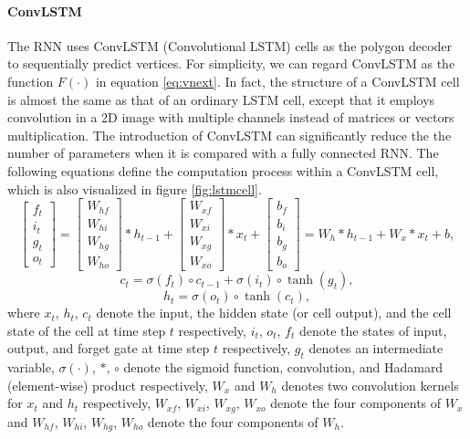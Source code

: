 \paragraph{ConvLSTM} The RNN uses ConvLSTM (Convolutional LSTM) cells as the polygon decoder to sequentially predict vertices. For simplicity, we can regard ConvLSTM as the function $F(\cdot)$ in equation \ref{eq:vnext}. In fact, the structure of a ConvLSTM cell is almost the same as that of an ordinary LSTM cell, except that it employs convolution in a 2D image with multiple channels instead of matrices or vectors multiplication. The introduction of ConvLSTM can significantly reduce the the number of parameters when it is compared with a fully connected RNN. The following equations define the computation process within a ConvLSTM cell, which is also visualized in figure \ref{fig:lstmcell}.
\begin{equation}
	\left[\begin{array}{c}
		f_t\\i_t\\g_t\\o_t
	\end{array}\right] = \left[\begin{array}{c}
		W_{hf}\\W_{hi}\\W_{hg}\\W_{ho}
	\end{array}\right] * h_{t-1} + \left[\begin{array}{c}
		W_{xf}\\W_{xi}\\W_{xg}\\W_{xo}
	\end{array}\right] * x_{t} + \left[\begin{array}{c}
		b_f\\b_i\\b_g\\b_o
	\end{array}\right] = W_h * h_{t-1} + W_x * x_t + b,
\end{equation}
\begin{equation}
	c_t = \sigma(f_t) \circ c_{t-1} + \sigma(i_t) \circ \tanh(g_t),
\end{equation}
\begin{equation}
	h_t = \sigma(o_t) \circ \tanh(c_t),
\end{equation}
where $x_t$, $h_t$, $c_t$ denote the input, the hidden state (or cell output), and the cell state of the cell at time step $t$ respectively, $i_t$, $o_t$, $f_t$ denote the states of input, output, and forget gate at time step $t$ respectively, $g_t$ denotes an intermediate variable, $\sigma(\cdot)$, $*$, $\circ$ denote the sigmoid function, convolution, and Hadamard (element-wise) product respectively, $W_x$ and $W_h$ denotes two convolution kernels for $x_t$ and $h_t$ respectively, $W_{xf}$, $W_{xi}$, $W_{xg}$, $W_{xo}$ denote the four components of $W_x$ and $W_{hf}$, $W_{hi}$, $W_{hg}$, $W_{ho}$ denote the four components of $W_h$.

